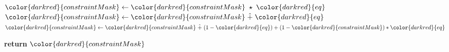 \begin{algorithm}[H]
\begin{algorithmic}[1]
            \State ${\color{darkred}{constraintMask}} \gets {\color{darkred}{constraintMask}} \hmul {\color{darkred}{eq}}$ 
            \State ${\color{darkred}{constraintMask}} \gets {\color{darkred}{constraintMask}} \hplus {\color{darkred}{eq}}$
            \State ${\color{darkred}{constraintMask}} \gets {\color{darkred}{constraintMask}} \hplus (1-{\color{darkred}{eq}}) + (1-{\color{darkred}{constraintMask}}) * {\color{darkred}{eq}}$
        \EndIf

    \EndFor

    \State \textbf{return} {${\color{darkred}{constraintMask}}$}
\EndProcedure

\end{algorithmic}
\end{algorithm}

